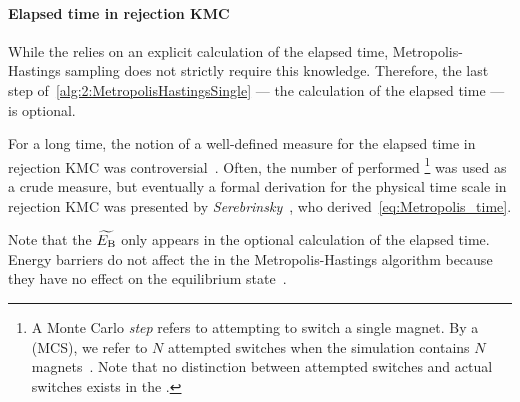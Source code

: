 \paragraph{Elapsed time in rejection KMC}
While the  relies on an explicit calculation of the elapsed time, Metropolis-Hastings sampling does not strictly require this knowledge.
Therefore, the last step of~\cref{alg:2:MetropolisHastingsSingle} --- the calculation of the elapsed time --- is optional. \par
For a long time, the notion of a well-defined measure for the elapsed time in rejection KMC was controversial~\cite{nfoldMCalgorithm,GlauberTimescale_sadiq1984,MCSim_StatPhys}. %
Often, the number of performed \footnote{
	A Monte Carlo \textit{step} refers to attempting to switch a single magnet.
	By a  (MCS), we refer to $N$ attempted switches when the simulation contains $N$ magnets~\cite{NumericalDynamicalNiedermayer}.
	Note that no distinction between attempted switches and actual switches exists in the .
} was used as a crude measure, but eventually a formal derivation for the physical time scale in rejection KMC was presented by \textit{Serebrinsky}~\cite{PhysicalTimeKMC}, who derived~\cref{eq:Metropolis_time}. \par
Note that the  $\widetilde{E_\mathrm{B}}$ only appears in the optional calculation of the elapsed time.
Energy barriers do not affect the  in the Metropolis-Hastings algorithm because they have no effect on the equilibrium state~\cite{DynamicalGlassyBehaviour}.

